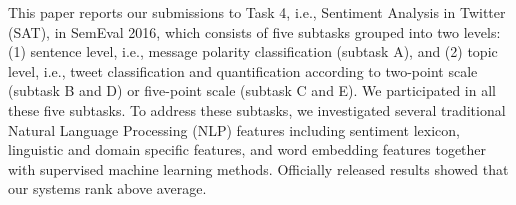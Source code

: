 This paper reports our submissions to Task 4, i.e., Sentiment Analysis in Twitter (SAT), in SemEval 2016, which consists of five subtasks grouped into two levels: (1) sentence level, i.e., message polarity classification (subtask A), and (2) topic level, i.e., tweet classification and quantification according to two-point scale (subtask B and D) or five-point scale (subtask C and E). We participated in all these five subtasks. To address these subtasks, we investigated several traditional Natural Language Processing (NLP) features including sentiment lexicon, linguistic and domain specific features, and word embedding features together with supervised machine learning methods. Officially released results showed that our systems rank above average.
